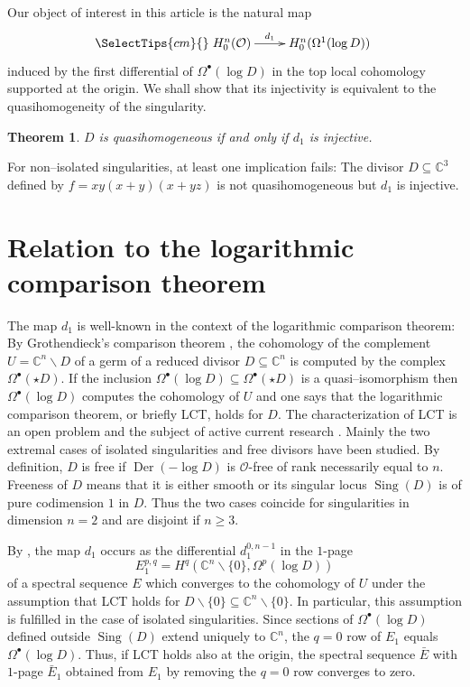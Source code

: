 \documentclass{amsart}
\theoremstyle{definition}
\theoremstyle{plain}
\newtheorem{thm}[ntn]{Theorem}
\theoremstyle{remark}
\newcommand{\C}{\mathbb{C}}
\renewcommand{\O}{\mathcal{O}}
\newcommand{\xymat}{\SelectTips{cm}{}\xymatrix}
\DeclareMathOperator{\Der}{Der}
\DeclareMathOperator{\Sing}{Sing}
\begin{document}
Our object of interest in this article is the natural map
\[
\xymat{
H^n_0(\O)\ar[r]^-{d_1}&H^n_0(\Omega^1(\log D))
}
\]
induced by the first differential of $\Omega^\bullet(\log D)$ in the top local cohomology supported at the origin. 
We shall show that its injectivity is equivalent to the quasihomogeneity of the singularity.

\begin{thm}\label{0}
$D$ is quasihomogeneous if and only if $d_1$ is injective.
\end{thm}

For non--isolated singularities, at least one implication fails:
The divisor $D\subseteq\C^3$ defined by $f=xy(x+y)(x+yz)$ is not quasihomogeneous but $d_1$ is injective.

\section{Relation to the logarithmic comparison theorem}

The map $d_1$ is well-known in the context of the logarithmic comparison theorem:
By Grothendieck's comparison theorem \cite{Gro66}, the cohomology of the complement $U=\C^n\smallsetminus D$ of a germ of a reduced divisor $D\subseteq\C^n$ is computed by the complex $\Omega^\bullet(\star D)$.
If the inclusion $\Omega^\bullet(\log D)\subseteq\Omega^\bullet(\star D)$ is a quasi--isomorphism then $\Omega^\bullet(\log D)$ computes the cohomology of $U$ and one says that the logarithmic comparison theorem, or briefly LCT, holds for $D$.
The characterization of LCT is an open problem and the subject of active current research \cite{Tor05}.
Mainly the two extremal cases of isolated singularities and free divisors have been studied.
By definition, $D$ is free if $\Der(-\log D)$ is $\O$-free of rank necessarily equal to $n$.
Freeness of $D$ means that it is either smooth or its singular locus $\Sing(D)$ is of pure codimension $1$ in $D$.
Thus the two cases coincide for singularities in dimension $n=2$ and are disjoint if $n\ge3$.

By \cite[Sect.~2]{CNM96,CMNC02}, the map $d_1$ occurs as the differential $d_1^{0,n-1}$ in the $1$-page 
\[
E_1^{p,q}=H^q(\C^n\smallsetminus\{0\},\Omega^p(\log D))
\]
of a spectral sequence $E$ which converges to the cohomology of $U$ under the assumption that LCT holds for $D\smallsetminus\{0\}\subseteq\C^n\smallsetminus\{0\}$.
In particular, this assumption is fulfilled in the case of isolated singularities.
Since sections of $\Omega^\bullet(\log D)$ defined outside $\Sing(D)$ extend uniquely to $\C^n$, the $q=0$ row of $E_1$ equals $\Omega^\bullet(\log D)$.
Thus, if LCT holds also at the origin, the spectral sequence $\bar E$ with $1$-page $\bar E_1$ obtained from $E_1$ by removing the $q=0$ row converges to zero.
\end{document}
